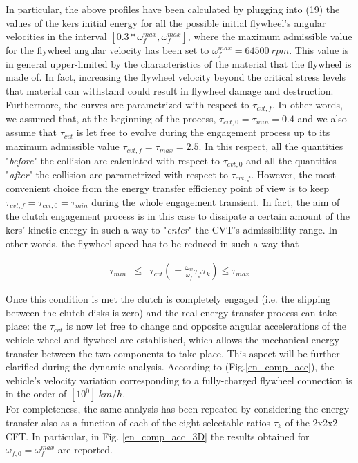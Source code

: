 \documentclass[11pt]{article}
\begin{document}
In particular, the above profiles have been calculated by plugging into (19) the values of the kers initial energy for all the possible initial flywheel's angular velocities in the interval $[0.3*\omega_f^{max}, \omega_f^{max}]$, where the maximum admissible value for the flywheel angular velocity has been set to $\omega_f^{max}=64500\ rpm$. This value is in general upper-limited by the characteristics of the material that the flywheel is made of. In fact, increasing the flywheel velocity beyond the critical stress levels that material can withstand could result in flywheel damage and destruction.\\ Furthermore, the curves are parametrized with respect to $\tau_{cvt,f}$. In other words, we assumed that, at the beginning of the process, $\tau_{cvt,0} = \tau_{min} = 0.4$ and we also assume that $\tau_{cvt}$ is let free to evolve during the engagement process up to its maximum admissible value $\tau_{cvt,f} = \tau_{max} = 2.5$. In this respect, all the quantities "\textit{before}" the collision are calculated with respect to $\tau_{cvt,0}$ and all the quantities "\textit{after}" the collision are parametrized with respect to $\tau_{cvt,f}$. However, the most convenient choice from the energy transfer efficiency point of view is to keep $\tau_{cvt,f} = \tau_{cvt,0} = \tau_{min}$ during the whole engagement transient. In fact, the aim of the clutch engagement process is in this case to dissipate a certain amount of the kers' kinetic energy in such a way to "\textit{enter}" the CVT's admissibility range. In other words, the flywheel speed has to be reduced in such a way that 

\begin{eqnarray}
\tau_{min}&\leq & \tau_{cvt} \left(= \frac{\omega_w}{\omega_f}\tau_f \tau_k\right)\leq \tau_{max}
\end{eqnarray}
          
Once this condition is met the clutch is completely engaged (i.e. the slipping between the clutch disks is zero) and the real energy transfer process can take place: the $\tau_{cvt}$ is now let free to change and opposite angular accelerations of the vehicle wheel and flywheel are established, which allows the mechanical energy transfer between the two components to take place. This aspect will be further clarified during the dynamic analysis. According to (Fig.\ref{en_comp_acc}), the vehicle's velocity variation corresponding to a fully-charged flywheel connection is in the order of $[10^0]\ km/h$.\\ For completeness, the same analysis has been repeated by considering the energy transfer also as a function of each of the eight selectable ratios $\tau_k$ of the 2x2x2 CFT. In particular, in Fig. \ref{en_comp_acc_3D} the results obtained for $\omega_{f,0} = \omega_f^{max}$ are reported. 
\end{document}
